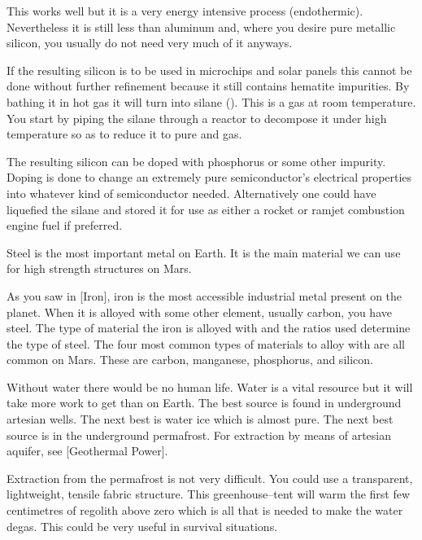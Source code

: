 \startformula
{}
\stopformula

This works well but it is a very energy intensive process (endothermic). Nevertheless it is still less than aluminum and, where you desire pure metallic silicon, you usually do not need very much of it anyways. 

If the resulting silicon is to be used in microchips and solar panels this cannot be done without further refinement because it still contains hematite impurities. By bathing it in hot  gas it will turn into silane (). This is a gas at room temperature. You start by piping the silane through a reactor to decompose it under high temperature so as to reduce it to pure  and  gas. 

The resulting silicon can be doped with phosphorus or some other impurity. Doping is done to change an extremely pure semiconductor's electrical properties into whatever kind of semiconductor needed. Alternatively one could have liquefied the silane and stored it for use as either a rocket or ramjet combustion engine fuel if preferred.

Steel is the most important metal on Earth. It is the main material we can use for high strength structures on Mars.

As you saw in [Iron], iron is the most accessible industrial metal present on the planet. When it is alloyed with some other element, usually carbon, you have steel. The type of material the iron is alloyed with and the ratios used determine the type of steel. The four most common types of materials to alloy with are all common on Mars. These are carbon, manganese, phosphorus, and silicon.

Without water there would be no human life. Water is a vital resource but it will take more work to get than on Earth. The best source is found in underground artesian wells. The next best is water ice which is almost pure. The next best source is in the underground permafrost. For extraction by means of artesian aquifer, see [Geothermal Power].

Extraction from the permafrost is not very difficult. You could use a transparent, lightweight, tensile fabric structure. This greenhouse--tent will warm the first few centimetres of regolith above zero which is all that is needed to make the water degas. This could be very useful in survival situations.

